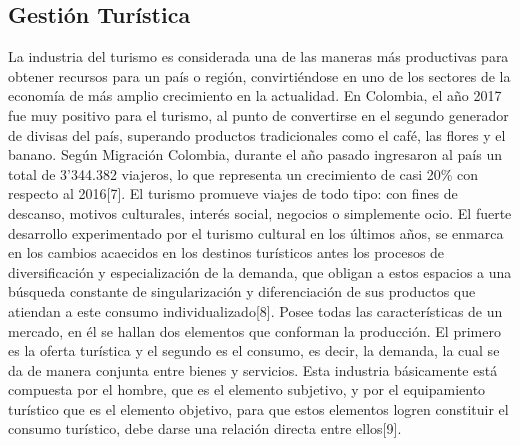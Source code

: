 \documentclass[12pt,letterpaper,openany]{book}
\begin{document}
\subsection{Gestión Turística}
La industria del turismo es considerada una de las maneras más productivas para obtener recursos para un país o región, convirtiéndose en uno de los sectores de la economía de más amplio crecimiento en la actualidad. En Colombia, el año 2017 fue muy positivo para el turismo, al punto de convertirse en el segundo generador de divisas del país, superando productos tradicionales como el café, las flores y el banano. Según Migración Colombia, durante el año pasado ingresaron al país un total de 3’344.382 viajeros, lo que representa un crecimiento de casi 20\% con respecto al 2016[7].
\vspace{5mm}\newline
El turismo promueve viajes de todo tipo: con fines de descanso, motivos culturales, interés social, negocios o simplemente ocio. El fuerte desarrollo experimentado por el turismo cultural en los últimos años, se enmarca en los cambios acaecidos en los destinos turísticos antes los procesos de diversificación y especialización de la demanda, que obligan a estos espacios a una búsqueda constante de singularización y diferenciación de sus productos que atiendan a este consumo individualizado[8].
\vspace{5mm}\newline
Posee todas las características de un mercado, en él se hallan dos elementos que conforman la producción. El primero es la oferta turística y el segundo es el consumo, es decir, la demanda, la cual se da de manera conjunta entre bienes y servicios. Esta industria básicamente está compuesta por el hombre, que es el elemento subjetivo, y por el equipamiento turístico que es el elemento objetivo, para que estos elementos logren constituir el consumo turístico, debe darse una relación directa entre ellos[9]. 
\end{document}
